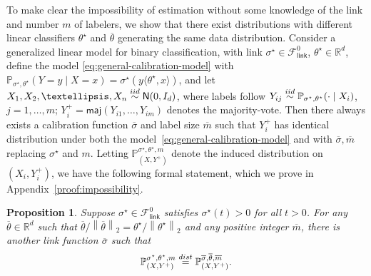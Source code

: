 \documentclass[11pt]{article}
\newcommand{\cc}[1]{\textcolor{cc}{[CC: #1]}}
\newcommand{\Prb}{\mathbb{P}}
\newcommand{\R}{\mathbb{R}} %
\renewcommand{\P}{\mathbb{P}}
\newcommand{\norm}[1]{\left\|{#1}\right\|} %
\newcommand{\wb}[1]{\overline{#1}}
\newcommand{\majY}{Y^+}
\newcommand{\normal}{\mathsf{N}}
\newcommand{\maj}{\mathsf{maj}}
\newcommand{\fsymlink}{\mathcal{F}_{\mathsf{link}}^0}
\newcommand{\ltwo}[1]{\norm{#1}_2} %
\newcommand{\<}{\langle} %
\renewcommand{\>}{\rangle}
\newcommand{\simiid}{\stackrel{\textup{iid}}{\sim}}
\newcommand{\opt}{^\star}
\newtheorem{proposition}{Proposition}
\begin{document}
%
To make clear the impossibility of estimation without some knowledge of the
link and number $m$ of labelers, we show that there exist distributions with
different linear classifiers $\theta\opt$ and $\wb{\theta}$ generating the
same data distribution.  Consider a generalized linear model for binary
classification, with link  $\sigma\opt \in \fsymlink$, $\theta\opt
\in \R^d$, define the model \eqref{eq:general-calibration-model} with
$\Prb_{\sigma\opt, \theta\opt}(Y = y \mid X = x) = \sigma\opt ( y \<
\theta\opt, x\>)$, and let $X_1, X_2, \ldots, X_n \simiid \normal(0, I_d)$,
where labels follow $Y_{ij}\simiid
\Prb_{\sigma\opt,\theta\opt}(\cdot \mid X_i)$, $j = 1, \ldots, m$;
$\majY_i = \maj(Y_{i1}, \ldots, Y_{im})$ denotes the majority-vote.
Then
there always exists a calibration function $\wb{\sigma}$ and label size
$\wb{m}$ such that $\majY_i$ has identical distribution under both the
model~\eqref{eq:general-calibration-model} and with $\wb{\sigma},
\wb{m}$ replacing $\sigma\opt$ and $m$.  Letting
$\P_{(X,\majY)}^{\sigma\opt, \theta\opt, m}$ denote the induced distribution
on $(X_i, \majY_i)$, we have the following formal statement, which we prove
in Appendix~\ref{proof:impossibility}.

\begin{proposition} \label{prop:impossibility}
  Suppose $\sigma\opt \in \fsymlink$ satisfies $\sigma\opt(t) > 0$ for all $ t > 0$. For any $\wb{\theta} \in \R^d$ such that $\wb{\theta}/\ltwo{\wb{\theta}} = \theta\opt/\ltwo{\theta\opt}$ and any positive integer $\wb{m}$, there is another link function $\wb{\sigma}$ such that 
  \begin{align*}
    \P_{(X,\majY)}^{\sigma\opt, \theta\opt, m} \stackrel{\textup{dist}}{=}
    \P_{(X,\majY)}^{\wb{\sigma}, \wb{\theta}, \wb{m}}.
  \end{align*}
\end{proposition}

\end{document}

